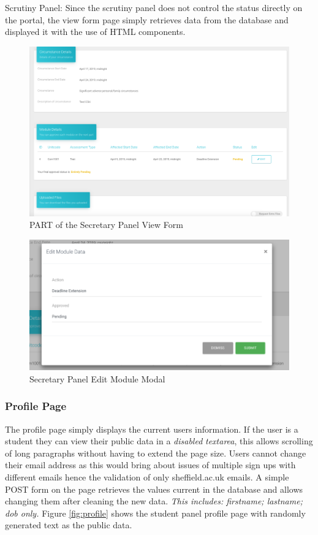 \documentclass[../main.tex]{subfiles}
\begin{document}
Scrutiny Panel: Since the scrutiny panel does not control the status directly on the portal, the view form page simply retrieves data from the database and displayed it with the use of HTML components. 

\begin{figure}[H]
        \includegraphics[scale=0.7]
        {images/secviewform.png}
        \caption{\label{fig:secviewform} PART of the Secretary Panel View Form}
      \end{figure}
      
\begin{figure}[H]
        \begin{center}
        \includegraphics[scale=0.7]
        {images/modal.png}
        \caption{\label{fig:modal} Secretary Panel Edit Module Modal}
        \end{center}
      \end{figure}

\subsubsection{Profile Page} 
The profile page simply displays the current users information. If the user is a student they can view their public data in a \textit{disabled} \textit{textarea}, this allows scrolling of long paragraphs without having to extend the page size. Users cannot change their email address as this would bring about issues of multiple sign ups with different emails hence the validation of only sheffield.ac.uk emails. A simple POST form on the page retrieves the values current in the database and allows changing them after cleaning the new data. \textit{This includes: firstname; lastname; dob only.} Figure \ref{fig:profile} shows the student panel profile page with randomly generated text as the public data. 
\end{document}
